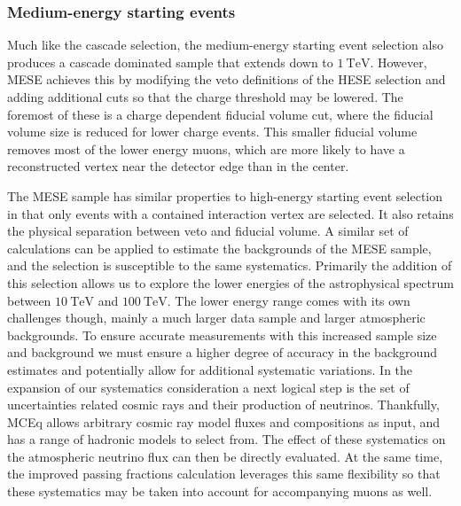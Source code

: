 \subsubsection{Medium-energy starting events}
Much like the cascade selection, the medium-energy starting event selection also produces a cascade dominated sample that extends down to $\SI{1}\TeV$.
However, MESE achieves this by modifying the veto definitions of the HESE selection and adding additional cuts so that the charge threshold may be lowered.
The foremost of these is a charge dependent fiducial volume cut, where the fiducial volume size is reduced for lower charge events.
This smaller fiducial volume removes most of the lower energy muons, which are more likely to have a reconstructed vertex near the detector edge than in the center.

The MESE sample has similar properties to high-energy starting event selection in that only events with a contained interaction vertex are selected.
It also retains the physical separation between veto and fiducial volume.
A similar set of calculations can be applied to estimate the backgrounds of the MESE sample, and the selection is susceptible to the same systematics.
Primarily the addition of this selection allows us to explore the lower energies of the astrophysical spectrum between $\SI{10}\TeV$ and $\SI{100}\TeV$.
The lower energy range comes with its own challenges though, mainly a much larger data sample and larger atmospheric backgrounds.
To ensure accurate measurements with this increased sample size and background we must ensure a higher degree of accuracy in the background estimates and potentially allow for additional systematic variations.
In the expansion of our systematics consideration a next logical step is the set of uncertainties related cosmic rays and their production of neutrinos.
Thankfully, MCEq allows arbitrary cosmic ray model fluxes and compositions as input, and has a range of hadronic models to select from. The effect of these systematics on the atmospheric neutrino flux can then be directly evaluated.
At the same time, the improved passing fractions calculation leverages this same flexibility so that these systematics may be taken into account for accompanying muons as well.

